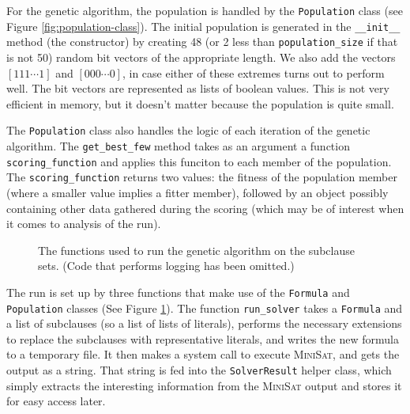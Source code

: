 \documentclass[proof,pdftex,11pt,a4,titlepage]{article}
\def\code{\lstinline[basicstyle=\textsize\ttfamily]}
\begin{document}
For the genetic algorithm, the population is handled by the \code{Population} class (see Figure \ref{fig:population-class}). The initial population is generated in the \code{__init__} method (the constructor) by creating 48 (or 2 less than \code{population_size} if that is not 50) random bit vectors of the appropriate length. We also add the vectors $[111\cdots1]$ and $[000\cdots0]$, in case either of these extremes turns out to perform well. The bit vectors are represented as lists of boolean values. This is not very efficient in memory, but it doesn't matter because the population is quite small.

The \code{Population} class also handles the logic of each iteration of the genetic algorithm. The \code{get_best_few} method takes as an argument a function \code{scoring_function} and applies this funciton to each member of the population. The \code{scoring_function} returns two values: the fitness of the population member (where a smaller value implies a fitter member), followed by an object possibly containing other data gathered during the scoring (which may be of interest when it comes to analysis of the run).

\begin{figure}[h]
  
  \caption{The functions used to run the genetic algorithm on the subclause sets. (Code that performs logging has been omitted.)}
  \label{fig:run-functions}
\end{figure}

The run is set up by three functions that make use of the \code{Formula} and \code{Population} classes (See Figure \ref{fig:run-functions}). The function \code{run_solver} takes a \code{Formula} and a list of subclauses (so a list of lists of literals), performs the necessary extensions to replace the subclauses with representative literals, and writes the new formula to a temporary file. It then makes a system call to execute \textsc{MiniSat}, and gets the output as a string. That string is fed into the \code{SolverResult} helper class, which simply extracts the interesting information from the \textsc{MiniSat} output and stores it for easy access later.
\end{document}
